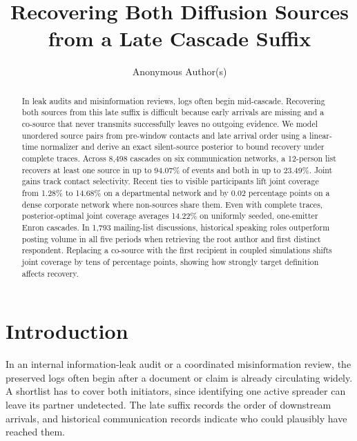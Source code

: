 \documentclass[a4paper,runningheads]{llncs}
\begin{document}
\title{Recovering Both Diffusion Sources from a Late Cascade Suffix}
\author{Anonymous Author(s)}
\maketitle
\begin{abstract}
In leak audits and misinformation reviews, logs often begin mid-cascade. Recovering both sources from this late suffix is difficult because early arrivals are missing and a co-source that never transmits successfully leaves no outgoing evidence. We model unordered source pairs from pre-window contacts and late arrival order using a linear-time normalizer and derive an exact silent-source posterior to bound recovery under complete traces. Across 8,498 cascades on six communication networks, a 12-person list recovers at least one source in up to 94.07\% of events and both in up to 23.49\%. Joint gains track contact selectivity. Recent ties to visible participants lift joint coverage from 1.28\% to 14.68\% on a departmental network and by 0.02 percentage points on a dense corporate network where non-sources share them. Even with complete traces, posterior-optimal joint coverage averages 14.22\% on uniformly seeded, one-emitter Enron cascades. In 1,793 mailing-list discussions, historical speaking roles outperform posting volume in all five periods when retrieving the root author and first distinct respondent. Replacing a co-source with the first recipient in coupled simulations shifts joint coverage by tens of percentage points, showing how strongly target definition affects recovery.
\end{abstract}

\section{Introduction}
In an internal information-leak audit or a coordinated misinformation review, the preserved logs often begin after a document or claim is already circulating widely. A shortlist has to cover both initiators, since identifying one active spreader can leave its partner undetected. The late suffix records the order of downstream arrivals, and historical communication records indicate who could plausibly have reached them.
\end{document}
